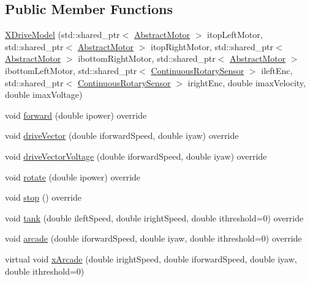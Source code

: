 \subsection*{Public Member Functions}
\begin{DoxyCompactItemize}
\item 
\mbox{\hyperlink{classokapi_1_1XDriveModel_a037b5cd463b8798b86e8bd9aa1098711}{X\+Drive\+Model}} (std\+::shared\+\_\+ptr$<$ \mbox{\hyperlink{classokapi_1_1AbstractMotor}{Abstract\+Motor}} $>$ itop\+Left\+Motor, std\+::shared\+\_\+ptr$<$ \mbox{\hyperlink{classokapi_1_1AbstractMotor}{Abstract\+Motor}} $>$ itop\+Right\+Motor, std\+::shared\+\_\+ptr$<$ \mbox{\hyperlink{classokapi_1_1AbstractMotor}{Abstract\+Motor}} $>$ ibottom\+Right\+Motor, std\+::shared\+\_\+ptr$<$ \mbox{\hyperlink{classokapi_1_1AbstractMotor}{Abstract\+Motor}} $>$ ibottom\+Left\+Motor, std\+::shared\+\_\+ptr$<$ \mbox{\hyperlink{classokapi_1_1ContinuousRotarySensor}{Continuous\+Rotary\+Sensor}} $>$ ileft\+Enc, std\+::shared\+\_\+ptr$<$ \mbox{\hyperlink{classokapi_1_1ContinuousRotarySensor}{Continuous\+Rotary\+Sensor}} $>$ iright\+Enc, double imax\+Velocity, double imax\+Voltage)
\item 
void \mbox{\hyperlink{classokapi_1_1XDriveModel_a2a26c9bd57c26ca0251040a14272226c}{forward}} (double ipower) override
\item 
void \mbox{\hyperlink{classokapi_1_1XDriveModel_ab36e677deea155bf9a691090f4b0f590}{drive\+Vector}} (double iforward\+Speed, double iyaw) override
\item 
void \mbox{\hyperlink{classokapi_1_1XDriveModel_a2a066629991985282b8205af6b03d9f6}{drive\+Vector\+Voltage}} (double iforward\+Speed, double iyaw) override
\item 
void \mbox{\hyperlink{classokapi_1_1XDriveModel_ab9a2d6f5e1f44b2c8640d41a534d4869}{rotate}} (double ipower) override
\item 
void \mbox{\hyperlink{classokapi_1_1XDriveModel_a2fe09b755e8a6f321d6365cedc774e04}{stop}} () override
\item 
void \mbox{\hyperlink{classokapi_1_1XDriveModel_a2d5bd618cae6e639083857f2ef310859}{tank}} (double ileft\+Speed, double iright\+Speed, double ithreshold=0) override
\item 
void \mbox{\hyperlink{classokapi_1_1XDriveModel_a0489ac1303ad42f65e346adf1dfc986f}{arcade}} (double iforward\+Speed, double iyaw, double ithreshold=0) override
\item 
virtual void \mbox{\hyperlink{classokapi_1_1XDriveModel_a473138faee428742772dee96b25031fb}{x\+Arcade}} (double iright\+Speed, double iforward\+Speed, double iyaw, double ithreshold=0)

\end{DoxyCompactItemize}
